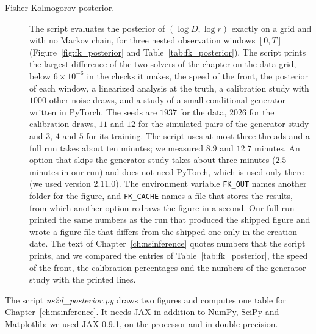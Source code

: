 \begin{description}
\item[Fisher Kolmogorov posterior.] The script evaluates the posterior of $(\log D,\log r)$ exactly on a grid and with no Markov chain, for three nested observation windows $[0,T]$ (Figure~\ref{fig:fk_posterior} and Table~\ref{tab:fk_posterior}). The script prints the largest difference of the two solvers of the chapter on the data grid, below $6\times10^{-6}$ in the checks it makes, the speed of the front, the posterior of each window, a linearized analysis at the truth, a calibration study with $1000$ other noise draws, and a study of a small conditional generator written in PyTorch. The seeds are $1937$ for the data, $2026$ for the calibration draws, $11$ and $12$ for the simulated pairs of the generator study and $3$, $4$ and $5$ for its training. The script uses at most three threads and a full run takes about ten minutes; we measured $8.9$ and $12.7$ minutes. An option that skips the generator study takes about three minutes ($2.5$ minutes in our run) and does not need PyTorch, which is used only there (we used version 2.11.0). The environment variable \texttt{FK\_OUT} names another folder for the figure, and \texttt{FK\_CACHE} names a file that stores the results, from which another option redraws the figure in a second. Our full run printed the same numbers as the run that produced the shipped figure and wrote a figure file that differs from the shipped one only in the creation date. The text of Chapter~\ref{ch:nsinference} quotes numbers that the script prints, and we compared the entries of Table~\ref{tab:fk_posterior}, the speed of the front, the calibration percentages and the numbers of the generator study with the printed lines.
\end{description}

The script \textit{ns2d\_posterior.py} draws two figures and computes one table for Chapter~\ref{ch:nsinference}. It needs JAX in addition to NumPy, SciPy and Matplotlib; we used JAX 0.9.1, on the processor and in double precision.

